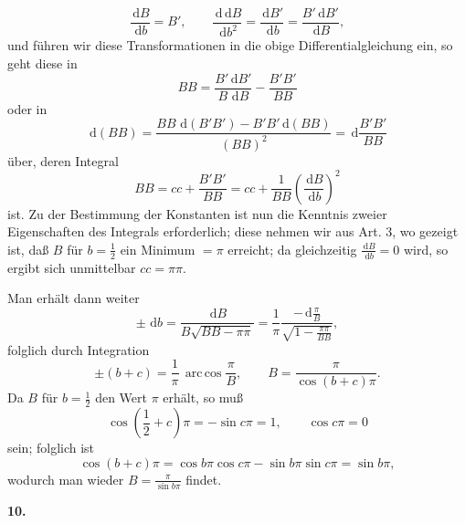 \documentclass[11pt]{article}
\newcommand{\dd}{\,\mathrm d}
\newcommand{\art}[1]{\bigskip\begin{center}\large\bfseries #1.\end{center}\nopagebreak}
\newcommand{\arccosop}{\operatorname{arc\,cos}}
\begin{document}
\[
\frac{\dd B}{\dd b}=B',\qquad
\frac{\dd\dd B}{\dd b^2}=\frac{\dd B'}{\dd b}
=\frac{B'\dd B'}{\dd B},
\]
und führen wir diese Transformationen in die obige Differentialgleichung ein, so geht diese in
\[
B B=\frac{B'\dd B'}{B\,\dd B}-\frac{B'B'}{B B}
\]
oder in
\[
\dd(BB)=
\frac{BB\,\dd(B'B')-B'B'\dd(BB)}{(BB)^2}
=\dd\frac{B'B'}{BB}
\]
über, deren Integral
\[
BB=cc+\frac{B'B'}{BB}
=cc+\frac1{BB}\left(\frac{\dd B}{\dd b}\right)^2
\]
ist. Zu der Bestimmung der Konstanten ist nun die Kenntnis zweier Eigenschaften des Integrals erforderlich; diese nehmen wir aus Art. 3, wo gezeigt ist, daß $B$ für $b=\frac12$ ein Minimum $=\pi$ erreicht; da gleichzeitig $\frac{\dd B}{\dd b}=0$ wird, so ergibt sich unmittelbar $cc=\pi\pi$.

Man erhält dann weiter
\[
\pm\,\dd b=
\frac{\dd B}{B\sqrt{BB-\pi\pi}}
=\frac1\pi
  \frac{-\dd\frac{\pi}{B}}
       {\sqrt{1-\frac{\pi\pi}{BB}}},
\]
folglich durch Integration
\[
\pm(b+c)=\frac1\pi\,\arccosop\frac{\pi}{B},
\qquad
B=\frac{\pi}{\cos(b+c)\pi}.
\]
Da $B$ für $b=\frac12$ den Wert $\pi$ erhält, so muß
\[
\cos\left(\frac12+c\right)\pi=-\sin c\pi=1,
\qquad \cos c\pi=0
\]
sein; folglich ist
\[
\cos(b+c)\pi=\cos b\pi\cos c\pi-\sin b\pi\sin c\pi=\sin b\pi,
\]
wodurch man wieder $B=\frac{\pi}{\sin b\pi}$ findet.

\art{10}
\end{document}

